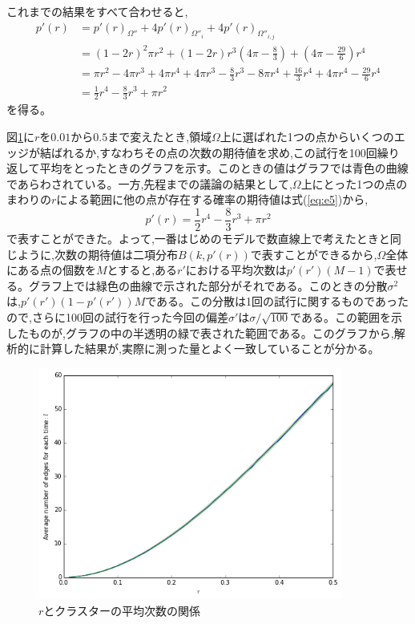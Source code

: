 これまでの結果をすべて合わせると,
\begin{align}
p'(r) &= p'(r)_{\Omega''} + 4p'(r)_{\Omega''_{i}} + 4p'(r)_{\Omega''_{i,j}}\nonumber \\
&= (1-2r)^{2}\pi r^{2} + (1-2r)r^{3}\left( 4\pi-\frac{8}{3} \right) + \left(4\pi -\frac{29}{6}\right)r^{4}\nonumber \\
&= \pi r^{2} - 4\pi r^{3} + 4\pi r^{4} + 4\pi r^{3} -\frac{8}{3}r^{3} - 8\pi r^{4} + \frac{16}{3}r^{4} + 4\pi r^{4} - \frac{29}{6}r^{4}\nonumber \\
&= \frac{1}{2}r^{4} -\frac{8}{3}r^{3} + \pi r^{2}
\label{eq:e5}
\end{align}
を得る。

図\ref{fig:f23}に$r$を$0.01$から$0.5$まで変えたとき,領域$\Omega$上に選ばれた1つの点からいくつのエッジが結ばれるか,すなわちその点の次数の期待値を求め,この試行を100回繰り返して平均をとったときのグラフを示す。このときの値はグラフでは青色の曲線であらわされている。一方,先程までの議論の結果として,$\Omega$上にとった1つの点のまわりの$r$による範囲に他の点が存在する確率の期待値は式(\ref{eq:e5})から,
\[p'(r) = \frac{1}{2}r^{4} -\frac{8}{3}r^{3} + \pi r^{2}\]
で表すことができた。よって,一番はじめのモデルで数直線上で考えたときと同じように,次数の期待値は二項分布$B(k,p'(r))$で表すことができるから,$\Omega$全体にある点の個数を$M$とすると,ある$r'$における平均次数は$p'(r')(M-1)$で表せる。グラフ上では緑色の曲線で示された部分がそれである。このときの分散$\sigma^{2}$は,$p'(r')(1-p'(r'))M$である。この分散は1回の試行に関するものであったので,さらに100回の試行を行った今回の偏差$\sigma'$は$\sigma/\sqrt{100}$である。この範囲を示したものが,グラフの中の半透明の緑で表された範囲である。このグラフから,解析的に計算した結果が,実際に測った量とよく一致していることが分かる。
\begin{figure}[H]
    \begin{center}
        \includegraphics[width=10cm]{../img/r_l.png}
        \caption{$r$とクラスターの平均次数の関係}
        \label{fig:f23}
    \end{center}
\end{figure}
